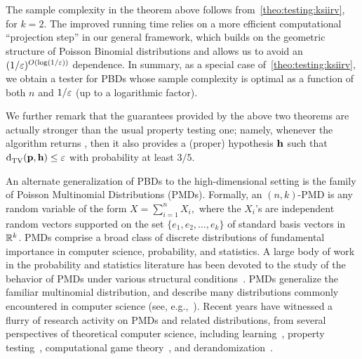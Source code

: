 The sample complexity in the theorem above follows from~\cref{theo:testing:ksiirv}, for $k=2$. 
The improved running time relies on a more efficient computational ``projection step''  in our general framework,
which builds on the geometric structure of Poisson Binomial distributions and allows us to avoid an $(1/\eps)^{\bigO{\log(1/\eps)}}$ dependence. 
In summary, as a special case of~\cref{theo:testing:ksiirv}, we obtain a tester for PBDs 
whose sample complexity is optimal as a function of both $n$ and $1/\varepsilon$ (up to a logarithmic factor).

We further remark that the guarantees provided by the above two theorems 
are actually stronger than the usual property testing one; namely, whenever the algorithm returns \accept, 
then it also provides a (proper) hypothesis $\mathbf{h}$ such that ${\operatorname{d}_{\rm{TV}}^{}\!\left({\mathbf{p}, \mathbf{h}}\right)}\leq \varepsilon$ with probability at least $3/5$.


An alternate generalization of PBDs to the high-dimensional setting is the family of
Poisson Multinomial Distributions (PMDs).
Formally, an $(n, k)$-PMD is any random variable of the form $X = \sum_{i=1}^n X_i,$
where the $X_i$'s are independent random vectors supported on the set
$\{e_1, e_2, \ldots, e_k \}$ of standard basis vectors in $\mathbb{R}^k$.
PMDs comprise a broad class of discrete distributions of fundamental importance in computer science, probability, and statistics.
A large body of work in the probability and statistics literature has been devoted to the study of the behavior
of PMDs under various structural conditions~\cite{Barbour:88, Loh:92, BHJ:92, Bentkus:03, Roos:99, Roos:10}.
PMDs generalize the familiar multinomial distribution, and describe many distributions commonly encountered in computer science (see, e.g.,~\cite{DP:07:AGT, DP:08:AGT, Valiant:11,VV:11:stoc}). Recent years have witnessed a flurry of research activity on PMDs and related distributions, from several perspectives of theoretical computer science, including learning~\cite{DDS:PBD:15, DDOST:13, DKS:15, DKT:15, DKS:15b}, property testing~\cite{Valiant:11, ValiantValiant:10lb, VV:11:stoc}, computational game theory~\cite{DP:07:AGT, DP:08:AGT,BorgsCIKMP:10,DP:09:AGT, DP:14:AGT, GT:15,CDS:17}, and derandomization~\cite{GMRZ:13, BDS:12, De:15, GKM:15}. 


